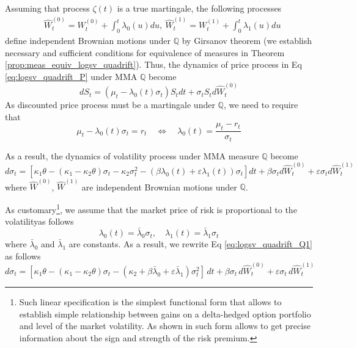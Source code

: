 \documentclass[pdftex,11pt,a4paper] {article}
\begin{document}
Assuming that process $\zeta(t)$ is a true martingale, the following processes
\begin{equation}
\begin{split}
&\hat{W}^{(0)}_t=W^{(0)}_t+\int_0^t\lambda_0(u)du, \ \hat{W}^{(1)}_t=W^{(1)}_t+\int_0^t\lambda_1(u)du
\end{split}
\end{equation}
define independent Brownian motions under $\mathbb{Q}$ by Girsanov theorem (we establish necessary and sufficient conditions for equivalence of measures in Theorem \ref{prop:meas_equiv_logsv_quadrift}). 
Thus, the dynamics of price process in Eq \eqref{eq:logsv_quadrift_P} under MMA $\mathbb{Q}$ become
\begin{equation*}
dS_{t} =  \left(\mu_{t}-\lambda_0(t)\sigma_t\right) S_{t} dt + \sigma_t S_{t} d\hat{W}^{(0)}_{t}
\end{equation*}
As discounted price process must be a martingale under $\mathbb{Q}$, we need to require that 
\begin{equation}\label{eq:MPR_logsv_quad}
\mu_{t}-\lambda_0(t)\sigma_t=r_t\quad \Longleftrightarrow\quad \lambda_0(t)=\frac{\mu_{t}-r_t}{\sigma_t}
\end{equation}


As a result, the dynamics of volatility process under MMA measure $\mathbb{Q}$ become
\begin{equation}\label{eq:logsv_quadrift_Q1}
d\sigma_t=\left[\kappa_1\theta-(\kappa_1-\kappa_2\theta)\sigma_t-\kappa_2\sigma_t^2-(\beta\lambda_0(t)+\varepsilon\lambda_1(t))\sigma_t\right]dt+\beta\sigma_t d\hat{W}^{(0)}_t+\varepsilon\sigma_t d\hat{W}^{(1)}_t
\end{equation}
where $\hat{W}^{(0)}$, $\hat{W}^{(1)}$ are independent Brownian motions under $\mathbb{Q}$.

As customary\footnote{Such linear specification is the simplest functional form that allows to establish simple relationship between gains on a delta-hedged option portfolio and level of the market volatility. As shown in \cite{BaskshiKapadia2003} such form  allows to get precise information about the sign and strength of the risk premium.}, we assume that the market price of risk is proportional to the volatilityas follows
\begin{equation}\label{eq:MPVR_logsv_quadrift}
\lambda_0(t)=\bar\lambda_0\sigma_t,\quad \lambda_1(t)=\bar\lambda_1\sigma_t
\end{equation}
where $\bar\lambda_0$ and $\bar\lambda_1$ are constants. As a result, we rewrite Eq \eqref{eq:logsv_quadrift_Q1} as follows
\begin{equation}\label{eq:logsv_quadrift_Q2}
d\sigma_t=\left[\kappa_1\theta-(\kappa_1-\kappa_2\theta)\sigma_t-(\kappa_2+\beta\bar\lambda_0+\varepsilon\bar\lambda_1)\sigma_t^2\right]\,dt+\beta\sigma_t\,d\hat{W}^{(0)}_t+\varepsilon\sigma_t\,d\hat{W}^{(1)}_t
\end{equation}
\end{document}
